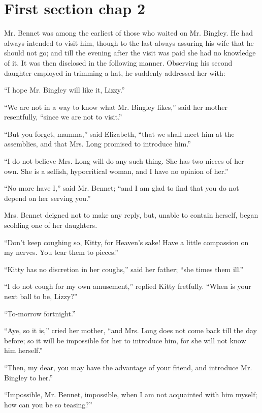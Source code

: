 \section{First section chap 2} \label{sect_21}
Mr. Bennet was among the earliest of those who waited on Mr.
      Bingley. He had always intended to visit him, though to the last
      always assuring his wife that he should not go; and till the
      evening after the visit was paid she had no knowledge of it. It
      was then disclosed in the following manner. Observing his second
      daughter employed in trimming a hat, he suddenly addressed her
      with:

      “I hope Mr. Bingley will like it, Lizzy.”

      “We are not in a way to know what Mr. Bingley likes,” said her
      mother resentfully, “since we are not to visit.”

      “But you forget, mamma,” said Elizabeth, “that we shall meet him
      at the assemblies, and that Mrs. Long promised to introduce him.”

      “I do not believe Mrs. Long will do any such thing. She has two
      nieces of her own. She is a selfish, hypocritical woman, and I
      have no opinion of her.”

      “No more have I,” said Mr. Bennet; “and I am glad to find that
      you do not depend on her serving you.”

      Mrs. Bennet deigned not to make any reply, but, unable to contain
      herself, began scolding one of her daughters.

      “Don’t keep coughing so, Kitty, for Heaven’s sake! Have a little
      compassion on my nerves. You tear them to pieces.”

      “Kitty has no discretion in her coughs,” said her father; “she
      times them ill.”

      “I do not cough for my own amusement,” replied Kitty fretfully.
      “When is your next ball to be, Lizzy?”

      “To-morrow fortnight.”

      “Aye, so it is,” cried her mother, “and Mrs. Long does not come
      back till the day before; so it will be impossible for her to
      introduce him, for she will not know him herself.”

      “Then, my dear, you may have the advantage of your friend, and
      introduce Mr. Bingley to her.”

      “Impossible, Mr. Bennet, impossible, when I am not acquainted
      with him myself; how can you be so teasing?”

